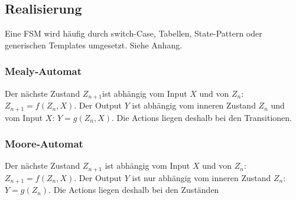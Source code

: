 \subsection{Realisierung}
Eine FSM wird häufig durch switch-Case, Tabellen, State-Pattern oder generischen Templates umgesetzt. Siehe Anhang.

\subsubsection{Mealy‐Automat}
Der nächste Zustand $Z_{n+1}$ist abhängig vom Input $X$ und von $Z_n$: $Z_{n+1} = f(Z_n, X)$.
Der Output $Y$ ist abhängig vom inneren Zustand $Z_n$ und vom Input $X$: $Y = g(Z_n, X)$.
Die Actions liegen deshalb bei den Transitionen.

\subsubsection{Moore‐Automat}
Der nächste Zustand $Z_{n+1}$ ist abhängig vom Input $X$ und von $Z_n$: $Z_{n+1} = f(Z_n, X)$.
Der Output $Y$ ist nur abhängig vom inneren Zustand $Z_n$: $Y = g(Z_n)$.
Die Actions liegen deshalb bei den Zuständen